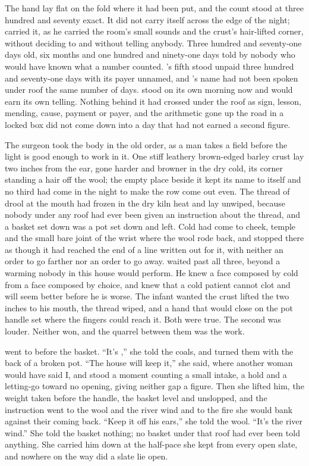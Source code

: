 
The hand lay flat on the fold where it had been put, and the count stood at three hundred and seventy exact. It did not carry itself across the edge of the night;  carried it, as he carried the room's small sounds and the crust's hair-lifted corner, without deciding to and without telling anybody. Three hundred and seventy-one days old, six months and one hundred and ninety-one days told by nobody who would have known what a number counted. 's fifth stood unpaid three hundred and seventy-one days with its payer unnamed, and 's name had not been spoken under  roof the same number of days.  stood on its own morning now and would earn its own telling. Nothing behind it had crossed under the roof as sign, lesson, mending, cause, payment or payer, and the arithmetic gone up the road in a locked box did not come down into a day that had not earned a second figure.

The surgeon took the body in the old order, as a man takes a field before the light is good enough to work in it. One stiff leathery brown-edged barley crust lay two inches from the ear, gone harder and browner in the dry cold, its corner standing a hair off the wool; the empty place beside it kept its name to itself and no third had come in the night to make the row come out even. The thread of drool at the mouth had frozen in the dry kiln heat and lay unwiped, because nobody under any roof had ever been given an instruction about the thread, and a basket set down was a pot set down and left. Cold had come to cheek, temple and the small bare joint of the wrist where the wool rode back, and stopped there as though it had reached the end of a line written out for it, with neither an order to go farther nor an order to go away.  waited past all three, beyond a warming nobody in this house would perform. He knew a face composed by cold from a face composed by choice, and knew that a cold patient cannot clot and will seem better before he is worse. The infant wanted the crust lifted the two inches to his mouth, the thread wiped, and a hand that would close on the pot handle set where the fingers could reach it. Both were true. The second was louder. Neither won, and the quarrel between them was the work.

 went to  before the basket. “It's ,” she told the coals, and turned them with the back of a broken pot. “The house will keep it,” she said, where another woman would have said I, and stood a moment counting a small intake, a hold and a letting-go toward no opening, giving neither gap a figure. Then she lifted him, the weight taken before the handle, the basket level and unslopped, and the instruction went to the wool and the river wind and to the fire she would bank against their coming back. “Keep it off his ears,” she told the wool. “It's the river wind.” She told the basket nothing; no basket under that roof had ever been told anything. She carried him down at the half-pace she kept from every open slate, and nowhere on the way did a slate lie open.

